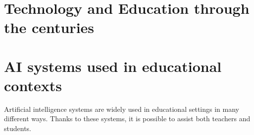\documentclass[a4paper,12pt]{article}
\begin{document}
\begin{comment}
Nel seguente elaborato troverai inizialmente un'introduzione su come la tecnologia, attraverso i secoli, sia stata gradualmente introdotta negli ambienti educativi, successivamente mi concentrerò su come i sistemi di intelligenza artificiale hanno iniziato ad avere un ruolo centrale in ambito educazionale ed infine  cercherò di analizzare i lati positivi e negativi dell'uso di questi sistemi nell'educazione dei giovani ragazzi.
\end{comment}

\section{Technology and Education through the centuries}

\section{AI systems used in educational contexts}
Artificial intelligence systems are widely used in educational settings in many different ways. Thanks to these systems, it is possible to assist both teachers and students.


\begin{comment}
    I sistemi di Intellgenza artificiale sono molto usati in ambito scolastico in molti modi diversi. Grazie a questi sistemi è possibile aiutare sia i docenti che gli student
\end{comment}


\newpage    %
\end{document}

